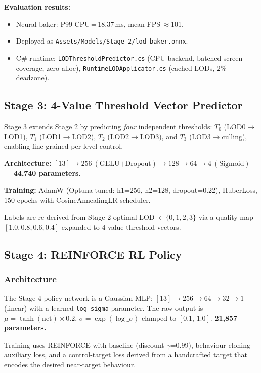 \documentclass[12pt, a4paper]{article}
\begin{document}
\textbf{Evaluation results:}
\begin{itemize}
  \item Neural baker: P99 CPU\,=\,18.37\,ms, mean FPS\,$\approx$101.
  \item Deployed as \texttt{Assets/Models/Stage\_2/lod\_baker.onnx}.
  \item C\# runtime: \texttt{LODThresholdPredictor.cs} (CPU backend, batched screen
    coverage, zero-alloc), \texttt{RuntimeLODApplicator.cs} (cached LODs, 2\%
    deadzone).
\end{itemize}

\subsection{Stage 3: 4-Value Threshold Vector Predictor}
\label{sec:stage3}

Stage 3 extends Stage 2 by predicting \emph{four} independent thresholds:
$T_0$ (LOD0$\to$LOD1), $T_1$ (LOD1$\to$LOD2), $T_2$ (LOD2$\to$LOD3),
and $T_3$ (LOD3$\to$culling), enabling fine-grained per-level control.

\textbf{Architecture:}
$[13] \to 256\ (\text{GELU+Dropout}) \to 128 \to 64 \to 4\ (\text{Sigmoid})$
— \textbf{44,740 parameters}.

\textbf{Training:} AdamW (Optuna-tuned: h1=256, h2=128, dropout=0.22),
HuberLoss, 150 epochs with CosineAnnealingLR scheduler.

Labels are re-derived from Stage 2 optimal LOD $\in \{0,1,2,3\}$ via a
quality map $[1.0, 0.8, 0.6, 0.4]$ expanded to 4-value threshold vectors.

\subsection{Stage 4: REINFORCE RL Policy}
\label{sec:stage4}

\subsubsection{Architecture}

The Stage 4 policy network is a Gaussian MLP:
$[13] \to 256 \to 64 \to 32 \to 1$ (linear) with a learned
\texttt{log\_sigma} parameter. The raw output is
$\mu = \tanh(\text{net}) \times 0.2$, $\sigma = \exp(\log\_\sigma)$ clamped to
$[0.1,\,1.0]$. \textbf{21,857 parameters.}

Training uses REINFORCE with baseline (discount $\gamma$=0.99), behaviour
cloning auxiliary loss, and a control-target loss derived from a handcrafted
target that encodes the desired near-target behaviour.
\end{document}
